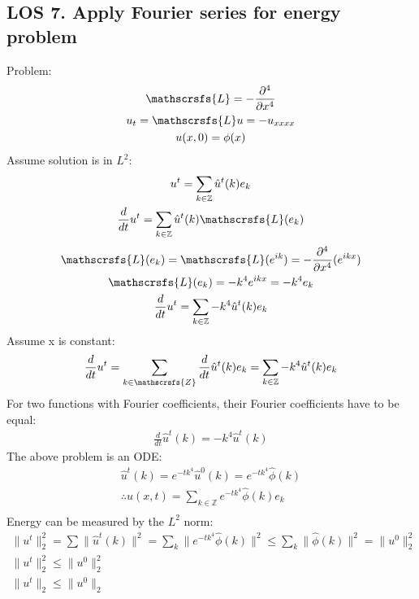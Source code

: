 \documentclass[12pt, a4paper]{article}
\begin{document}
\subsection*{LOS 7. Apply Fourier series for energy problem}
Problem: 
\begin{gather*}
    \mathscrsfs{L} = -\frac{\partial^4}{\partial x^4}\\
    u_t = \mathscrsfs{L}u = -u_{xxxx}\\
    u(x, 0) = \phi(x)
\end{gather*}
Assume solution is in $L^2$:
\begin{gather*}
    u^t = \sum_{k \in \mathbb{Z}} \hat{u}^t(k)e_k\\
    \frac{d}{dt}u^t = \sum_{k \in \mathbb{Z}} \hat{u}^t(k)\mathscrsfs{L}(e_k)
\end{gather*}
\begin{gather*}
    \mathscrsfs{L}(e_k) = \mathscrsfs{L}(e^{ik}) = -\frac{\partial^4}{\partial x^4}(e^{ikx})\\
    \mathscrsfs{L}(e_k) = -k^4e^{ikx} = -k^4e_k \\
    \frac{d}{dt}u^t = \sum_{k \in \mathbb{Z}}-k^4 \hat{u}^t(k)e_k\\
\end{gather*}
Assume x is constant:
\begin{gather*}
    \frac{d}{dt}u^t = \sum_{k \in \mathscrsfs{Z}} \frac{d}{dt}\hat{u}^t(k)e_k = \sum_{k \in \mathbb{Z}}-k^4 \hat{u}^t(k)e_k \\
\end{gather*}
For two functions with Fourier coefficients, their Fourier coefficients have to be equal:
\begin{gather*}
    \frac{d}{dt}\hat{u}^t(k)= -k^4 \hat{u}^t(k)
\end{gather*}
The above problem is an ODE:
\begin{gather*}
    \hat{u}^t(k) = e^{-tk^4}\hat{u}^0(k) = e^{-tk^4}\hat{\phi}(k)\\
    \therefore u(x, t) = \sum_{k \in \mathbb{Z}}e^{-tk^4}\hat{\phi}(k)e_k\\
\end{gather*}
Energy can be measured by the $L^2$ norm:
\begin{gather*}
    \|u^t\|_2^2 = \sum \|\hat{u}^t(k)\|^2 = \sum_k \|e^{-tk^4}\hat{\phi}(k)\|^2 \leq \sum_k \|\hat{\phi}(k)\|^2 = \|u^0\|_2^2\\
    \|u^t\|_2^2 \leq \|u^0\|_2^2\\
    \|u^t\|_2 \leq \|u^0\|_2
\end{gather*}
\vspace{0.3em}
\end{document}
